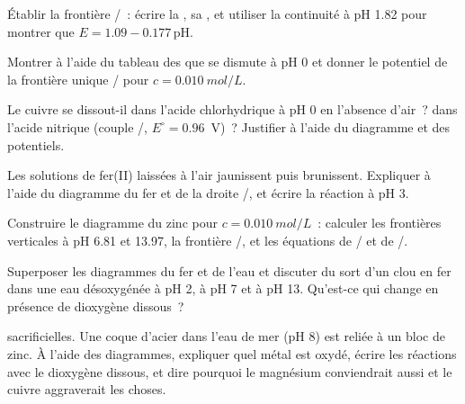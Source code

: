 \begin{exercise}[$\star\star$]\label{exo:b1:e-ph-diagrams:6}
Établir la frontière /~: écrire la ,
sa , et utiliser la continuité à pH 1.82 pour montrer
que $E = 1.09 -
0.177\,\mathrm{pH}$.
\end{exercise}

\begin{exercise}[$\star\star$]\label{exo:b1:e-ph-diagrams:7}
Montrer à l'aide du tableau des  que  se
dismute à pH 0 et donner le potentiel de la frontière unique
/ pour $c = \qty{0.010}{mol/L}$.
\end{exercise}

\begin{exercise}[$\star\star$]\label{exo:b1:e-ph-diagrams:8}
Le cuivre se dissout-il dans l'acide chlorhydrique à pH 0 en l'absence
d'air~? dans l'acide nitrique (couple /,
$E^\circ = 0.96$~V)~? Justifier à l'aide du diagramme et des potentiels.
\end{exercise}

\begin{exercise}[$\star\star$]\label{exo:b1:e-ph-diagrams:9}
Les solutions de fer(II) laissées à l'air jaunissent puis brunissent.
Expliquer à l'aide du diagramme du fer et de la droite
/, et écrire la réaction à pH 3.
\end{exercise}

\begin{exercise}[$\star\star\star$]\label{exo:b1:e-ph-diagrams:10}
Construire le diagramme du zinc pour $c = \qty{0.010}{mol/L}$~: calculer
les frontières verticales à pH 6.81 et 13.97, la frontière
/, et les équations de / et de
/.
\end{exercise}

\begin{exercise}[$\star\star\star$]\label{exo:b1:e-ph-diagrams:11}
Superposer les diagrammes du fer et de l'eau et discuter du sort d'un
clou en fer dans une eau désoxygénée à pH 2, à pH 7 et à pH 13. Qu'est-ce
qui change en présence de dioxygène dissous~?
\end{exercise}

\begin{exercise}[$\star\star\star$]\label{exo:b1:e-ph-diagrams:12}
 sacrificielles. Une coque d'acier dans l'eau de mer (pH 8) est
reliée à un bloc de zinc. À l'aide des diagrammes, expliquer quel métal
est oxydé, écrire les réactions avec le dioxygène dissous, et dire
pourquoi le magnésium conviendrait aussi et le cuivre aggraverait les
choses.
\end{exercise}

